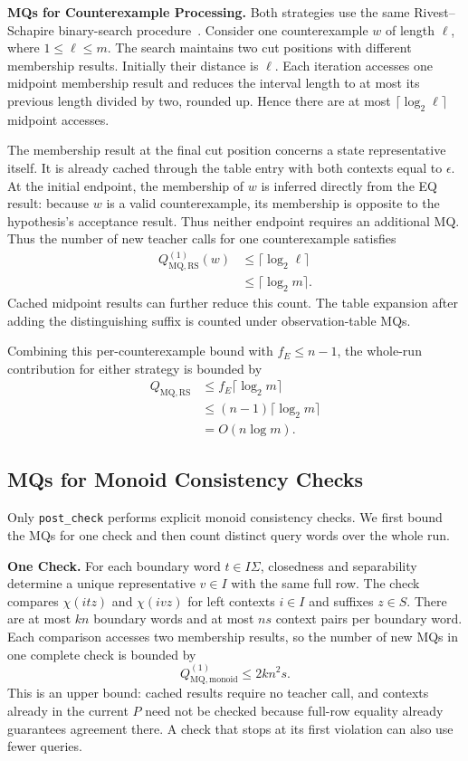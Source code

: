 \documentclass{ieice-tecrep}
\begin{document}
\textbf{MQs for Counterexample Processing.}
Both strategies use the same Rivest--Schapire binary-search
procedure~\cite{rivest1993inference}. Consider one counterexample
\(w\) of length \(\ell\), where \(1\le\ell\le m\). The search
maintains two cut positions with different membership results.
Initially their distance is \(\ell\). Each iteration accesses one
midpoint membership result and reduces the interval length to at
most its previous length divided by two, rounded up. Hence there
are at most \(\lceil\log_2\ell\rceil\) midpoint accesses.

The membership result at the final cut position concerns a state
representative itself. It is already cached through the table entry
with both contexts equal to \(\epsilon\). At the initial endpoint,
the membership of \(w\) is inferred directly from the EQ result:
because \(w\) is a valid counterexample, its membership is opposite
to the hypothesis's acceptance result. Thus neither endpoint requires
an additional MQ.
Thus the number of new teacher calls for one counterexample satisfies
\[
\begin{aligned}
Q_{\mathrm{MQ},\mathrm{RS}}^{(1)}(w)
&\le \lceil\log_2\ell\rceil\\
&\le \lceil\log_2 m\rceil.
\end{aligned}
\]
Cached midpoint results can further reduce this count. The table
expansion after adding the distinguishing suffix is counted under
observation-table MQs.

Combining this per-counterexample bound with \(f_E\le n-1\), the
whole-run contribution for either strategy is bounded by
\[
\begin{aligned}
Q_{\mathrm{MQ},\mathrm{RS}}
&\le f_E\lceil\log_2 m\rceil\\
&\le(n-1)\lceil\log_2 m\rceil\\
&=O(n\log m).
\end{aligned}
\]

\subsection{MQs for Monoid Consistency Checks}\label{complexity-monoid-mqs}

Only \texttt{post\_check} performs explicit monoid consistency checks.
We first bound the MQs for one check and then count distinct query
words over the whole run.

\textbf{One Check.}
For each boundary word \(t\in I\Sigma\), closedness and separability
determine a unique representative \(v\in I\) with the same full row.
The check compares \(\chi(itz)\) and \(\chi(ivz)\) for left contexts
\(i\in I\) and suffixes \(z\in S\). There are at most \(kn\)
boundary words and at most \(ns\) context pairs per boundary word.
Each comparison accesses two membership results, so the number of
new MQs in one complete check is bounded by
\[
Q_{\mathrm{MQ},\mathrm{monoid}}^{(1)}\le2kn^2s.
\]
This is an upper bound: cached results require no teacher call, and
contexts already in the current \(P\) need not be checked because
full-row equality already guarantees agreement there. A check that
stops at its first violation can also use fewer queries.
\end{document}
